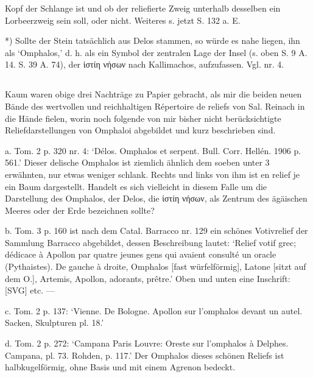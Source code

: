 \documentclass[a4paper, 11pt, oneside]{article}
\begin{document}
Kopf der Schlange ist und ob der reliefierte Zweig unterhalb desselben ein Lorbeerzweig sein soll, oder nicht. Weiteres s. jetzt S. 132 a. E.

*) Sollte der Stein tatsächlich aus Delos stammen, so würde es nahe liegen, ihn als `Omphalos,' d. h. als ein Symbol der zentralen Lage der Insel (s. oben S. 9 A. 14. S. 39 A. 74), der ἱστίη νήσων nach Kallimachos, aufzufassen. Vgl. nr. 4.

\subsection{}
\paragraph{}
Kaum waren obige drei Nachträge zu Papier gebracht, als mir die beiden neuen Bände des wertvollen und reichhaltigen Répertoire de reliefs von Sal. Reinach in die Hände fielen, worin noch folgende von mir bisher nicht berücksichtigte Reliefdarstellungen von Omphaloi abgebildet und kurz beschrieben sind.

a. Tom. 2 p. 320 nr. 4: `Délos. Omphalos et serpent. Bull. Corr. Hellén. 1906 p. 561.' Dieser delische Omphalos ist ziemlich ähnlich dem soeben unter 3 erwähnten, nur etwas weniger schlank. Rechts und links von ihm ist en relief je ein Baum dargestellt. Handelt es sich vielleicht in diesem Falle um die Darstellung des Omphalos, der Delos, die ἱστίη νήσων, als Zentrum des ägäischen Meeres oder der Erde bezeichnen sollte?

b. Tom. 3 p. 160 ist nach dem Catal. Barracco nr. 129 ein schönes Votivrelief der Sammlung Barracco abgebildet, dessen Beschreibung lautet: `Relief votif grec; dédicace à Apollon par quatre jeunes gens qui avaient consulté un oracle (Pythaistes). De gauche à droite, Omphalos [fast würfelförmig], Latone [sitzt auf dem O.], Artemis, Apollon, adorants, prêtre.' Oben und unten eine Inschrift: [SVG] etc. ---

c. Tom. 2 p. 137: `Vienne. De Bologne. Apollon sur l'omphalos devant un autel. Sacken, Skulpturen pl. 18.'

d. Tom. 2 p. 272: `Campana Paris Louvre: Oreste sur l'omphalos à Delphes. Campana, pl. 73. Rohden, p. 117.' Der Omphalos dieses schönen Reliefs ist halbkugelförmig, ohne Basis und mit einem Agrenon bedeckt.

\subsection{}
\end{document}
